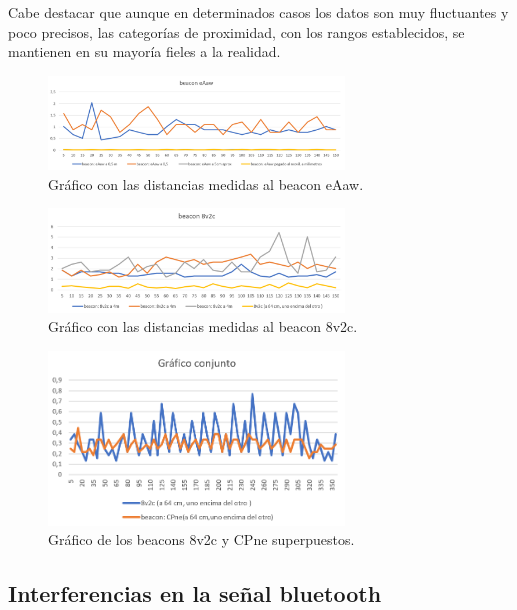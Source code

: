 Cabe destacar que aunque en determinados casos los datos son muy fluctuantes y poco precisos, las categorías de proximidad, con los rangos establecidos, se mantienen en su mayoría fieles a la realidad.


\begin{figure}[t]
	\centering
	\includegraphics[width=0.7\textwidth]{Imagenes/Descripciondeltrabajo/dist_eAaw}
	\caption{Gráfico con las distancias medidas al beacon eAaw. }
	\label{fig:dist_eAaw}
\end{figure}


\begin{figure}[t]
	\centering
	\includegraphics[width=0.7\textwidth]{Imagenes/Descripciondeltrabajo/dist_8v2c}
	\caption{Gráfico con las distancias medidas al beacon 8v2c. }
	\label{fig:dist_8v2c}
\end{figure}

\begin{figure}[t]
	\centering
	\includegraphics[width=0.7\textwidth]{Imagenes/Descripciondeltrabajo/dist_conjunto}
	\caption{Gráfico de los beacons 8v2c y CPne superpuestos. }
	\label{fig:dist_conjunto}
\end{figure}

\subsection{Interferencias en la señal bluetooth}

